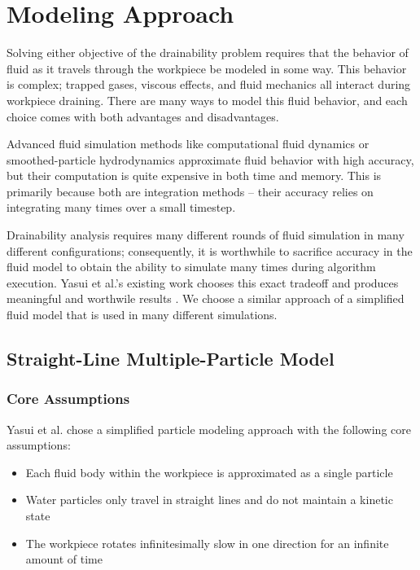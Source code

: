 						\chapter{Modeling Approach}

Solving either objective of the drainability problem requires that the behavior of fluid as it travels through the workpiece be modeled in some way. This behavior is complex; trapped gases, viscous effects, and fluid mechanics all interact during workpiece draining. There are many ways to model this fluid behavior, and each choice comes with both advantages and disadvantages.

Advanced fluid simulation methods like computational fluid dynamics or smoothed-particle hydrodynamics approximate fluid behavior with high accuracy, but their computation is quite expensive in both time and memory. This is primarily because both are integration methods -- their accuracy relies on integrating many times over a small timestep.

Drainability analysis requires many different rounds of fluid simulation in many different configurations; consequently, it is worthwhile to sacrifice accuracy in the fluid model to obtain the ability to simulate many times during algorithm execution. Yasui et al.'s existing work chooses this exact tradeoff and produces meaningful and worthwile results \cite{Yasui2011}. We choose a similar approach of a simplified fluid model that is used in many different simulations.

\section{Straight-Line Multiple-Particle Model}

	\subsection{Core Assumptions}

Yasui et al. \cite{Yasui2011} chose a simplified particle modeling approach with the following core assumptions:

\begin{itemize}
	\item Each fluid body within the workpiece is approximated as a single particle
	\item Water particles only travel in straight lines and do not maintain a kinetic state
	\item The workpiece rotates infinitesimally slow in one direction for an infinite amount of time
\end{itemize}

